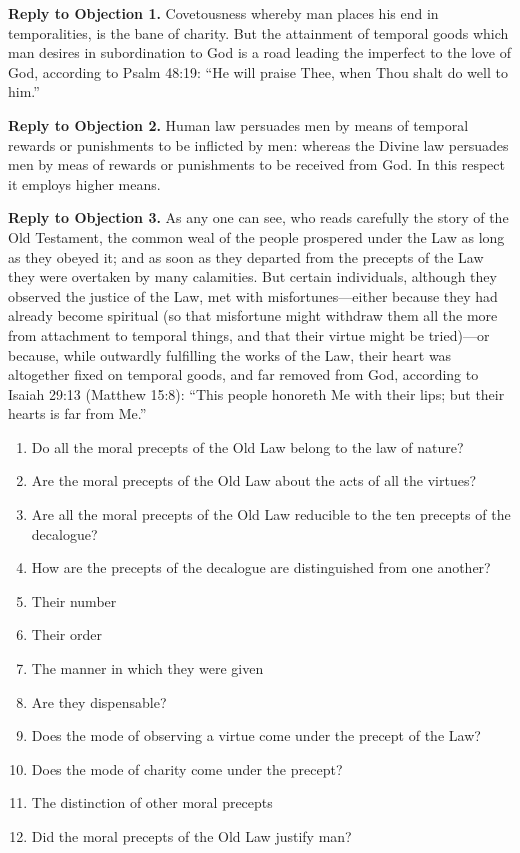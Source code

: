 \textbf{Reply to Objection 1.} Covetousness whereby man places his end in temporalities, is the bane of charity. But the attainment of temporal goods which man desires in subordination to God is a road leading the imperfect to the love of God, according to Psalm 48:19: ``He will praise Thee, when Thou shalt do well to him.''

\textbf{Reply to Objection 2.} Human law persuades men by means of temporal rewards or punishments to be inflicted by men: whereas the Divine law persuades men by meas of rewards or punishments to be received from God. In this respect it employs higher means.

\textbf{Reply to Objection 3.} As any one can see, who reads carefully the story of the Old Testament, the common weal of the people prospered under the Law as long as they obeyed it; and as soon as they departed from the precepts of the Law they were overtaken by many calamities. But certain individuals, although they observed the justice of the Law, met with misfortunes—either because they had already become spiritual (so that misfortune might withdraw them all the more from attachment to temporal things, and that their virtue might be tried)—or because, while outwardly fulfilling the works of the Law, their heart was altogether fixed on temporal goods, and far removed from God, according to Isaiah 29:13 (Matthew 15:8): ``This people honoreth Me with their lips; but their hearts is far from Me.''


\begin{enumerate}

\item  Do all the moral precepts of the Old Law belong to the law of nature? 
\item  Are the moral precepts of the Old Law about the acts of all the virtues? 
\item  Are all the moral precepts of the Old Law reducible to the ten precepts of the decalogue? 
\item  How are the precepts of the decalogue are distinguished from one another? 
\item  Their number 
\item  Their order 
\item  The manner in which they were given 
\item  Are they dispensable? 
\item  Does the mode of observing a virtue come under the precept of the Law? 
\item  Does the mode of charity come under the precept? 
\item  The distinction of other moral precepts 
\item  Did the moral precepts of the Old Law justify man? 
\end{enumerate}

